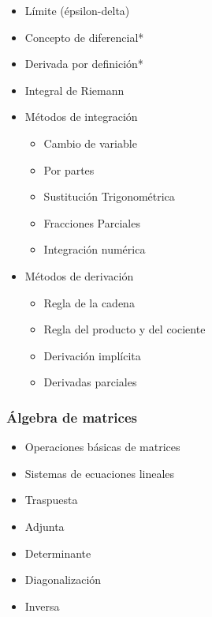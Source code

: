 \documentclass{article}
\begin{document}
                \begin{itemize}
                    \item Límite (épsilon-delta)
                    \item Concepto de diferencial*
                    \item Derivada por definición*
                    \item Integral de Riemann

                    \item Métodos de integración
                    \begin{itemize}
                        \item Cambio de variable
                        \item Por partes
                        \item Sustitución Trigonométrica
                        \item Fracciones Parciales
                        \item Integración numérica
                    \end{itemize}

                    \item Métodos de derivación
                    \begin{itemize}
                        \item Regla de la cadena
                        \item Regla del producto y del cociente
                        \item Derivación implícita
                        \item Derivadas parciales
                    \end{itemize}
                \end{itemize}

            \subsubsection{Álgebra de matrices}

                \begin{itemize}
                    \item Operaciones básicas de matrices
                    \item Sistemas de ecuaciones lineales
                    \item Traspuesta
                    \item Adjunta
                    \item Determinante
                    \item Diagonalización
                    \item Inversa
                \end{itemize}
\end{document}

